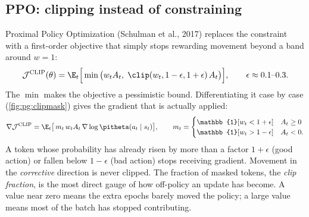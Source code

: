 \subsection{PPO: clipping instead of constraining}\label{sec:pg:ppo}

Proximal Policy Optimization (Schulman et al., 2017) replaces the constraint with a
first-order objective that simply stops rewarding movement beyond a band around
$w=1$:
\begin{equation}
\mathcal{J}^{\text{CLIP}}(\theta)=\E_t\Big[\min\big(w_t A_t,\;\clip(w_t,1-\epsilon,1+\epsilon)\,A_t\big)\Big],
\qquad \epsilon\approx0.1\text{--}0.3 .
\label{eq:pg:ppo}
\end{equation}
The $\min$ makes the objective a pessimistic bound. Differentiating it case by case
(\cref{fig:pg:clipmask}) gives the gradient that is actually applied:
\begin{equation}
\nabla\mathcal{J}^{\text{CLIP}}=\E_t\big[\,m_t\,w_t A_t\,\nabla\log\pitheta(a_t\mid s_t)\big],\qquad
m_t=\begin{cases}\mathbb{1}[w_t<1+\epsilon] & A_t\ge0\\ \mathbb{1}[w_t>1-\epsilon] & A_t<0.\end{cases}
\end{equation}
A token whose probability has already risen by more than a factor $1+\epsilon$ (good action)
or fallen below $1-\epsilon$ (bad action) stops receiving gradient. Movement in the
\emph{corrective} direction is never clipped. The fraction of masked tokens, the \emph{clip
fraction}, is the most direct gauge of how off-policy an update has become. A value near zero
means the extra epochs barely moved the policy; a large value means most of the batch has
stopped contributing.

